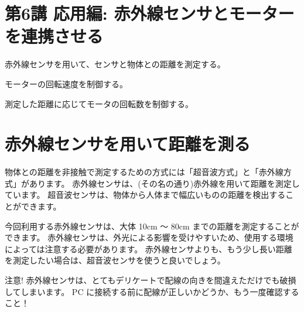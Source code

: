 \documentclass[11pt,a4paper]{jarticle}
\begin{document}
\section*{\LARGE{第6講 応用編: 赤外線センサとモーターを連携させる}}
赤外線センサを用いて、センサと物体との距離を測定する。

モーターの回転速度を制御する。

測定した距離に応じてモータの回転数を制御する。


\section{赤外線センサを用いて距離を測る}
物体との距離を非接触で測定するための方式には「超音波方式」と「赤外線方式」があります。
赤外線センサは、(その名の通り)赤外線を用いて距離を測定しています。
超音波センサは、物体から人体まで幅広いものの距離を検出することができます。

今回利用する赤外線センサは、大体 10cm 〜 80cm までの距離を測定することができます。
赤外線センサは、外光による影響を受けやすいため、使用する環境によっては注意する必要があります。
赤外線センサよりも、もう少し長い距離を測定したい場合は、超音波センサを使うと良いでしょう。


\begin{itembox}[l]{注意!}
 赤外線センサは、とてもデリケートで配線の向きを間違えただけでも破損してしまいます。
 PC に接続する前に配線が正しいかどうか、もう一度確認すること！
\end{itembox}
\end{document}
